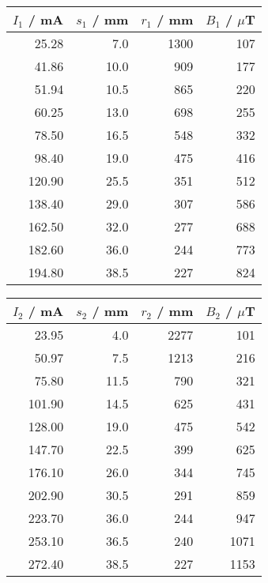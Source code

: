 \begin{tabular}{r|rrr}
$I_1$ / mA & $s_1$ / mm & $r_1$ / mm & $B_1$ / $\mu$T \\
\hline
25.28 & 7.0 & 1300 & 107\\
41.86 & 10.0 & 909 & 177\\
51.94 & 10.5 & 865 & 220\\
60.25 & 13.0 & 698 & 255\\
78.50 & 16.5 & 548 & 332\\
98.40 & 19.0 & 475 & 416\\
120.90 & 25.5 & 351 & 512\\
138.40 & 29.0 & 307 & 586\\
162.50 & 32.0 & 277 & 688\\
182.60 & 36.0 & 244 & 773\\
194.80 & 38.5 & 227 & 824\\
\end{tabular}\quad\quad\quad\begin{tabular}{r|rrr}
$I_2$ / mA & $s_2$ / mm & $r_2$ / mm & $B_2$ / $\mu$T \\
\hline
23.95 & 4.0 & 2277 & 101\\
50.97 & 7.5 & 1213 & 216\\
75.80 & 11.5 & 790 & 321\\
101.90 & 14.5 & 625 & 431\\
128.00 & 19.0 & 475 & 542\\
147.70 & 22.5 & 399 & 625\\
176.10 & 26.0 & 344 & 745\\
202.90 & 30.5 & 291 & 859\\
223.70 & 36.0 & 244 & 947\\
253.10 & 36.5 & 240 & 1071\\
272.40 & 38.5 & 227 & 1153\\
\end{tabular}
